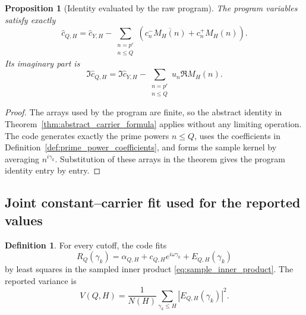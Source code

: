 \documentclass[11pt]{amsart}
\numberwithin{equation}{section}
\theoremstyle{plain}
\newtheorem{proposition}[theorem]{Proposition}
\theoremstyle{definition}
\newtheorem{definition}[theorem]{Definition}
\theoremstyle{remark}
\newcommand{\1}{\mathbf{1}}
\begin{document}
\begin{proposition}[Identity evaluated by the raw program]
\label{prop:numerical_raw_identity}
The program variables satisfy exactly
\begin{equation}
\widehat c_{Q,H}
=
\widehat c_{Y,H}
-
\sum_{\substack{n=p^r\\n\leq Q}}
\left(c_n^-\overline{M_H(n)}+c_n^+M_H(n)\right).
\label{eq:numerical_raw_identity}
\end{equation}
Its imaginary part is
\begin{equation}
\Im\widehat c_{Q,H}
=
\Im\widehat c_{Y,H}
-
\sum_{\substack{n=p^r\\n\leq Q}}
u_n\Re M_H(n).
\label{eq:numerical_imag_identity}
\end{equation}
\end{proposition}

\begin{proof}
The arrays used by the program are finite, so the abstract identity in
Theorem~\ref{thm:abstract_carrier_formula} applies without any limiting
operation.  The code generates exactly the prime powers \(n\leq Q\), uses
the coefficients in Definition~\ref{def:prime_power_coefficients}, and
forms the sample kernel by averaging \(n^{i\gamma_k}\).  Substitution of
these arrays in the theorem gives the program identity entry by entry.
\end{proof}

\subsection{Joint constant--carrier fit used for the reported values}
\label{subsec:numerical_joint_fit}

\begin{definition}
\label{def:numerical_joint_fit}
For every cutoff, the code fits
\begin{equation}
R_Q(\gamma_k)
=
\alpha_{Q,H}+c_{Q,H}e^{i\omega\gamma_k}+E_{Q,H}(\gamma_k)
\label{eq:numerical_joint_model}
\end{equation}
by least squares in the sampled inner product
\eqref{eq:sample_inner_product}.  The reported variance is
\begin{equation}
V(Q,H)
=
\frac1{N(H)}
\sum_{\gamma_k\leq H}|E_{Q,H}(\gamma_k)|^2.
\label{eq:numerical_reported_variance}
\end{equation}
\end{definition}
\end{document}

